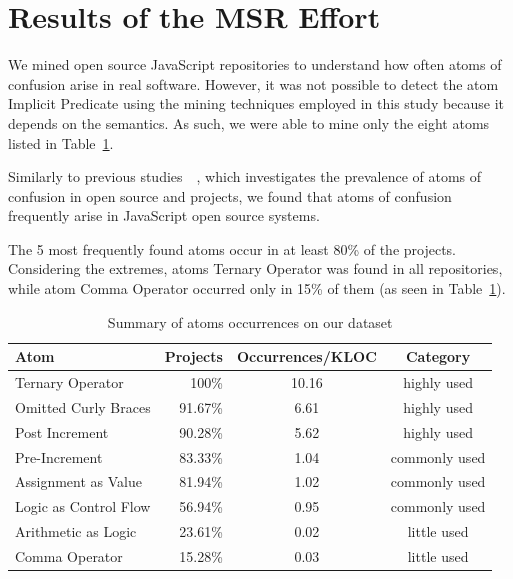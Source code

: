 \section{Results of the MSR Effort}
\label{sec:msr-results} 

We mined \minedprojects open source JavaScript repositories to understand how often atoms of confusion arise in real software. However, it was not possible to detect the atom Implicit Predicate using the mining techniques employed in this study because it depends on the semantics. As such, we were able to mine only the eight atoms listed in Table~\ref{tab:occurrences-summary}.

Similarly to previous studies~\cite{DBLP:conf/msr/GopsteinZFC18}~\cite{DBLP:journals/ese/MedeirosLAAKRG19}, which investigates the prevalence of atoms of confusion in open source \clang and \cpplang projects, we found that atoms of confusion frequently arise in JavaScript open source systems.

The 5 most frequently found atoms occur in at least 80\% of the projects.
Considering the extremes, atoms Ternary Operator was found in all repositories, while atom Comma Operator occurred only in 15\% of them (as seen in Table~\ref{tab:occurrences-summary}).




\begin{table}[!htb]
\centering
 \caption{Summary of atoms occurrences on our dataset}
 
\setlength\tabcolsep{2pt} %
\label{tab:occurrences-summary}
\begin{tabular}{lrcc}

  \hline
Atom & Projects & Occurrences/KLOC & Category \\ 
 \hline
Ternary Operator & 100\% & 10.16 &  highly used \\ 
Omitted Curly Braces & 91.67\% & 6.61 &  highly used \\ 
Post Increment & 90.28\% & 5.62 &  highly used \\ 
Pre-Increment & 83.33\% & 1.04 & commonly used \\ 
Assignment as Value & 81.94\% & 1.02 & commonly used \\ 
Logic as Control Flow & 56.94\% & 0.95 & commonly used \\ 
Arithmetic as Logic & 23.61\% & 0.02 & little used \\ 
Comma Operator & 15.28\% & 0.03 & little used \\ 
   \hline
\end{tabular}
\end{table}


